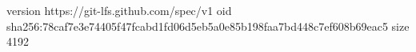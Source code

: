 version https://git-lfs.github.com/spec/v1
oid sha256:78caf7e3e74405f47fcabd1fd06d5eb5a0e85b198faa7bd448c7ef608b69eac5
size 4192
